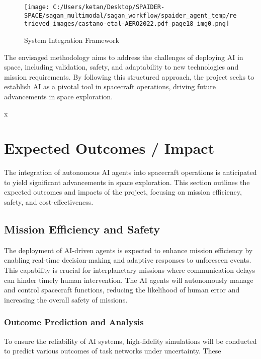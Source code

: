 \documentclass[a4paper,12pt]{article}
\begin{document}
\begin{figure}[htbp]
    \centering
    \texttt{[image: C:/Users/ketan/Desktop/SPAIDER-SPACE/sagan\_multimodal/sagan\_workflow/spaider\_agent\_temp/retrieved\_images/castano-etal-AERO2022.pdf\_page18\_img0.png]}
    \caption{System Integration Framework}
    \label{fig:system-integration}
\end{figure}

The envisaged methodology aims to address the challenges of deploying AI in space, including validation, safety, and adaptability to new technologies and mission requirements. By following this structured approach, the project seeks to establish AI as a pivotal tool in spacecraft operations, driving future advancements in space exploration.



x
\section{Expected Outcomes / Impact}

The integration of autonomous AI agents into spacecraft operations is anticipated to yield significant advancements in space exploration. This section outlines the expected outcomes and impacts of the project, focusing on mission efficiency, safety, and cost-effectiveness.

\subsection{Mission Efficiency and Safety}

The deployment of AI-driven agents is expected to enhance mission efficiency by enabling real-time decision-making and adaptive responses to unforeseen events. This capability is crucial for interplanetary missions where communication delays can hinder timely human intervention. The AI agents will autonomously manage and control spacecraft functions, reducing the likelihood of human error and increasing the overall safety of missions.

\subsubsection{Outcome Prediction and Analysis}

To ensure the reliability of AI systems, high-fidelity simulations will be conducted to predict various outcomes of task networks under uncertainty. These simulations will provide a comprehensive view of the potential impacts on mission progress and performance. Figure \ref{fig:mission-planning-tool} illustrates the Mission Planning Prediction Results tool, which aggregates the outcomes of simulation runs, aiding operators in understanding the expected behavior of constructed plans.
\end{document}
